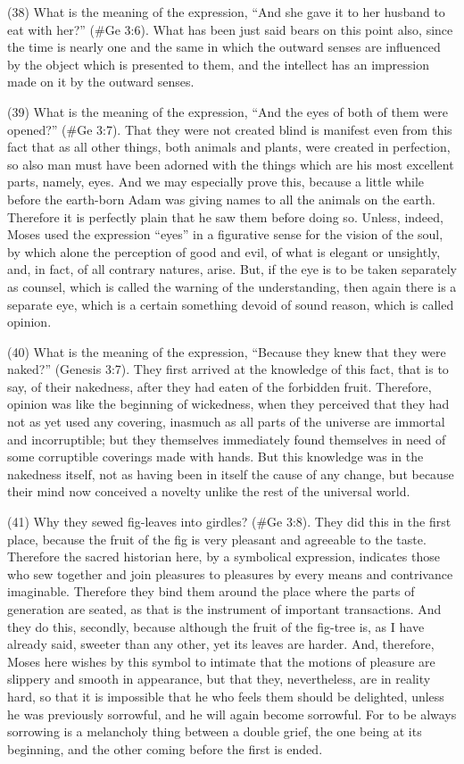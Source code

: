 (38) What is the meaning of the expression, ``And she gave it to her husband to eat with her?''
(\#Ge 3:6). What has been just said bears on this point also, since the time is nearly one and
the same in which the outward senses are influenced by the object which is presented to them, and
the intellect has an impression made on it by the outward senses.

(39) What is the meaning of the expression, ``And the eyes of both of them were opened?''
(\#Ge 3:7). That they were not created blind is manifest even from this fact that as all other
things, both animals and plants, were created in perfection, so also man must have been adorned
with the things which are his most excellent parts, namely, eyes. And we may especially prove this,
because a little while before the earth-born Adam was giving names to all the animals on the earth.
Therefore it is perfectly plain that he saw them before doing so. Unless, indeed, Moses used the
expression ``eyes'' in a figurative sense for the vision of the soul, by which alone the perception of
good and evil, of what is elegant or unsightly, and, in fact, of all contrary natures, arise. But, if the
eye is to be taken separately as counsel, which is called the warning of the understanding, then
again there is a separate eye, which is a certain something devoid of sound reason, which is
called opinion.

(40) What is the meaning of the expression, ``Because they knew that they were naked?'' (Genesis
3:7). They first arrived at the knowledge of this fact, that is to say, of their nakedness, after they
had eaten of the forbidden fruit. Therefore, opinion was like the beginning of wickedness, when
they perceived that they had not as yet used any covering, inasmuch as all parts of the universe
are immortal and incorruptible; but they themselves immediately found themselves in need of some
corruptible coverings made with hands. But this knowledge was in the nakedness itself, not as
having been in itself the cause of any change, but because their mind now conceived a novelty
unlike the rest of the universal world.

(41) Why they sewed fig-leaves into girdles? (\#Ge 3:8). They did this in the first place,
because the fruit of the fig is very pleasant and agreeable to the taste. Therefore the sacred
historian here, by a symbolical expression, indicates those who sew together and join pleasures to
pleasures by every means and contrivance imaginable. Therefore they bind them around the place
where the parts of generation are seated, as that is the instrument of important transactions. And
they do this, secondly, because although the fruit of the fig-tree is, as I have already said, sweeter
than any other, yet its leaves are harder. And, therefore, Moses here wishes by this symbol to
intimate that the motions of pleasure are slippery and smooth in appearance, but that they,
nevertheless, are in reality hard, so that it is impossible that he who feels them should be delighted,
unless he was previously sorrowful, and he will again become sorrowful. For to be always
sorrowing is a melancholy thing between a double grief, the one being at its beginning, and the
other coming before the first is ended.

